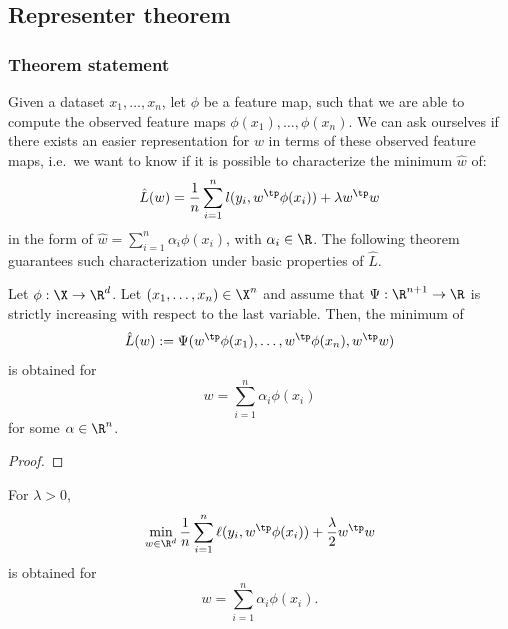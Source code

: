 \documentclass{../cs-classes/cs-classes}
\begin{document}
\subsection{Representer theorem}
\subsubsection{Theorem statement}
Given a dataset $x_1, \dots, x_n$, let $\phi$ be a feature map, such that we are able to compute the observed feature maps $\phi(x_1), \dots, \phi(x_n)$. We can ask ourselves if there exists an easier representation for $w$ in terms of these observed feature maps, i.e.~we want to know if it is possible to characterize the minimum $\hat{w}$ of:
\begin{equation*}
    \hat{L}(w) = \frac{1}{n}\sum_{i=1}^n l(y_i, w^\tp\phi(x_i)) + \lambda w^\tp w
\end{equation*}
in the form of $\hat{w} = \sum_{i=1}^n \alpha_i\phi(x_i)$, with $\alpha_i\in\R$. The following theorem guarantees such characterization under basic properties of $\hat{L}$.

\begin{theorem}
    Let $\phi:\X\to\R^d$. Let $(x_1, \dots, x_n)\in\X^n$ and assume that $\Psi:\R^{n+1}\to\R$ is strictly increasing with respect to the last variable. Then, the minimum of
    \begin{equation*}
        \hat{L}(w) := \Psi(w^\tp\phi(x_1), \dots, w^\tp\phi(x_n), w^\tp w)
    \end{equation*}
    is obtained for
    \begin{equation*}
        w=\sum_{i=1}^n \alpha_i \phi(x_i)
    \end{equation*} for some $\alpha\in\R^n$.
\end{theorem}

\begin{proof}
\end{proof}

\begin{corollary}
    For $\lambda>0$, 
    \begin{equation*}
        \min_{w\in\R^d} \frac{1}{n} \sum_{i=1}^n \ell(y_i, w^\tp\phi(x_i)) + \frac{\lambda}{2} w^\tp w
    \end{equation*}
    is obtained for
    \begin{equation*}
        w = \sum_{i=1}^n \alpha_i\phi(x_i).
    \end{equation*}
\end{corollary}
\end{document}
